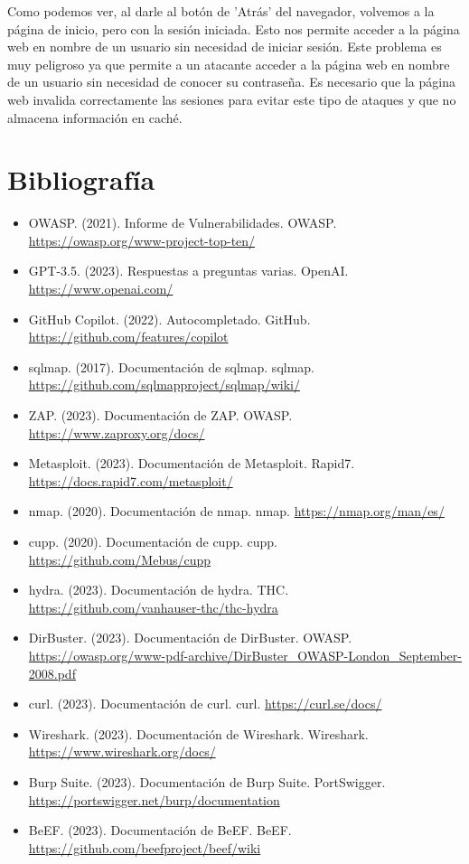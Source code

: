 \documentclass{report}
\begin{document}
                Como podemos ver, al darle al botón de 'Atrás' del navegador, volvemos a la página de inicio, pero con la sesión iniciada.
                Esto nos permite acceder a la página web en nombre de un usuario sin necesidad de iniciar sesión.
                Este problema es muy peligroso ya que permite a un atacante acceder a la página web en nombre de un usuario sin necesidad de conocer su contraseña.
                Es necesario que la página web invalida correctamente las sesiones para evitar este tipo de ataques y que no almacena información en caché.
            \clearpage
    \chapter{Bibliografía}
        \begin{itemize}
            \item OWASP. (2021). Informe de Vulnerabilidades. OWASP. \url{https://owasp.org/www-project-top-ten/}
            \item GPT-3.5. (2023). Respuestas a preguntas varias. OpenAI. \url{https://www.openai.com/}
            \item GitHub Copilot. (2022). Autocompletado. GitHub. \url{https://github.com/features/copilot}
            \item sqlmap. (2017). Documentación de sqlmap. sqlmap. \url{https://github.com/sqlmapproject/sqlmap/wiki/}
            \item ZAP. (2023). Documentación de ZAP. OWASP. \url{https://www.zaproxy.org/docs/}
            \item Metasploit. (2023). Documentación de Metasploit. Rapid7. \url{https://docs.rapid7.com/metasploit/}
            \item nmap. (2020). Documentación de nmap. nmap. \url{https://nmap.org/man/es/}
            \item cupp. (2020). Documentación de cupp. cupp. \url{https://github.com/Mebus/cupp}
            \item hydra. (2023). Documentación de hydra. THC. \url{https://github.com/vanhauser-thc/thc-hydra}
            \item DirBuster. (2023). Documentación de DirBuster. OWASP. \url{https://owasp.org/www-pdf-archive/DirBuster_OWASP-London_September-2008.pdf}
            \item curl. (2023). Documentación de curl. curl. \url{https://curl.se/docs/}
            \item Wireshark. (2023). Documentación de Wireshark. Wireshark. \url{https://www.wireshark.org/docs/}
            \item Burp Suite. (2023). Documentación de Burp Suite. PortSwigger. \url{https://portswigger.net/burp/documentation}
            \item BeEF. (2023). Documentación de BeEF. BeEF. \url{https://github.com/beefproject/beef/wiki}
        \end{itemize}
\end{document}
